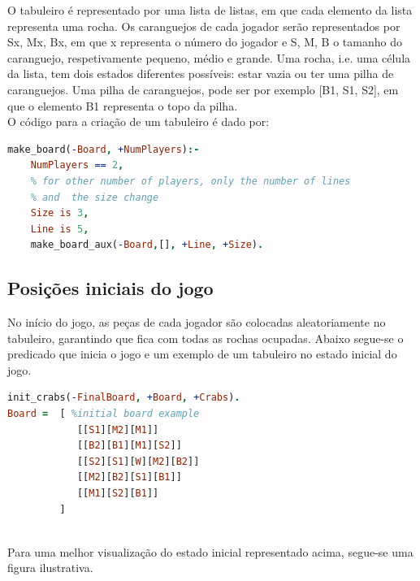 \documentclass[a4paper]{article}
\begin{document}
O tabuleiro é representado por uma lista de listas, em que cada elemento da lista representa uma rocha. Os caranguejos de cada jogador serão representados por Sx, Mx, Bx, em que x representa o número do jogador e S, M, B o tamanho do caranguejo, respetivamente pequeno, médio e grande. Uma rocha, i.e. uma célula da lista, tem dois estados diferentes possíveis: estar vazia ou ter uma pilha de caranguejos. Uma pilha de caranguejos, pode ser por exemplo [B1, S1, S2], em que o elemento B1 representa o topo da pilha.
\\O código para a criação de um tabuleiro é dado por:

\begin{lstlisting}[language=Prolog]
make_board(-Board, +NumPlayers):-
	NumPlayers == 2,
	% for other number of players, only the number of lines
	% and  the size change
	Size is 3,
	Line is 5,
	make_board_aux(-Board,[], +Line, +Size).
\end{lstlisting}

\subsection{Posições iniciais do jogo}

No início do jogo, as peças de cada jogador são colocadas aleatoriamente no tabuleiro, garantindo que fica com todas as rochas ocupadas. Abaixo segue-se o predicado que inicia o jogo e um exemplo de um tabuleiro no estado inicial do jogo.
\begin{lstlisting}[language=Prolog]
init_crabs(-FinalBoard, +Board, +Crabs).
Board =  [ %initial board example
    	 	[[S1][M2][M1]]
         	[[B2][B1][M1][S2]]
         	[[S2][S1][W][M2][B2]]
    	 	[[M2][B2][S1][B1]]
    	 	[[M1][S2][B1]]
    	 ]
     
\end{lstlisting}

Para uma melhor visualização do estado inicial representado acima, segue-se uma figura ilustrativa.
\end{document}
